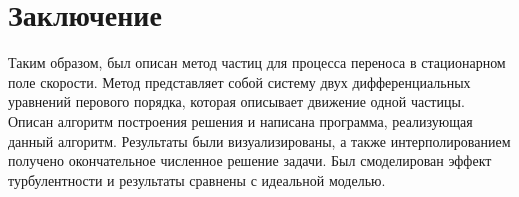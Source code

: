 \section{Заключение}
    Таким образом, был описан метод частиц для процесса переноса в стационарном поле скорости. Метод представляет собой систему двух дифференциальных уравнений перового порядка, которая описывает движение одной частицы. Описан алгоритм построения решения и написана программа, реализующая данный алгоритм. Результаты были визуализированы, а также интерполированием получено окончательное численное решение задачи. Был смоделирован эффект турбулентности и результаты сравнены с идеальной моделью.
